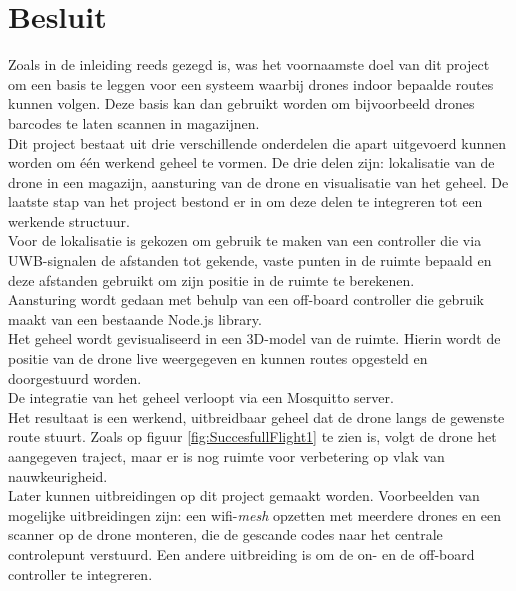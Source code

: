 \chapter*{Besluit}
Zoals in de inleiding reeds gezegd is, was het voornaamste doel van dit project om een basis te leggen voor een systeem waarbij drones indoor bepaalde routes kunnen volgen.
Deze basis kan dan gebruikt worden om bijvoorbeeld drones barcodes te laten scannen in magazijnen.\\

Dit project bestaat uit drie verschillende onderdelen die apart uitgevoerd kunnen worden om één werkend geheel te vormen.
De drie delen zijn: lokalisatie van de drone in een magazijn, aansturing van de drone en visualisatie van het geheel.
De laatste stap van het project bestond er in om deze delen te integreren tot een werkende structuur.\\

Voor de lokalisatie is gekozen om gebruik te maken van een controller die via UWB-signalen de afstanden tot gekende, vaste punten in de ruimte bepaald en deze afstanden gebruikt om zijn positie in de ruimte te berekenen.\\
Aansturing wordt gedaan met behulp van een off-board controller die gebruik maakt van een bestaande Node.js library.\\
Het geheel wordt gevisualiseerd in een 3D-model van de ruimte. Hierin wordt de positie van de drone live weergegeven en kunnen routes opgesteld en doorgestuurd worden.\\
De integratie van het geheel verloopt via een Mosquitto server.\\

Het resultaat is een werkend, uitbreidbaar geheel dat de drone langs de gewenste route stuurt. Zoals op figuur \ref{fig:SuccesfullFlight1} te zien is, volgt de drone het aangegeven traject, maar er is nog ruimte voor verbetering op vlak van nauwkeurigheid.\\

Later kunnen uitbreidingen op dit project gemaakt worden. Voorbeelden van mogelijke uitbreidingen zijn: een wifi-\textit{mesh} opzetten met meerdere drones en een scanner op de drone monteren, die de gescande codes naar het centrale controlepunt verstuurd.
Een andere uitbreiding is om de on- en de off-board controller te integreren.\\